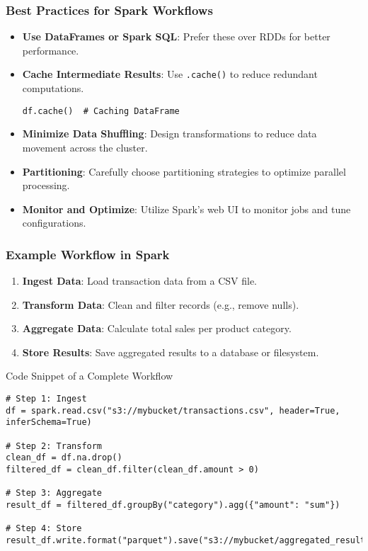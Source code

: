 \documentclass[aspectratio=169]{beamer}
\begin{document}
\begin{frame}[fragile]
    \frametitle{Best Practices for Spark Workflows}
    \begin{itemize}
        \item \textbf{Use DataFrames or Spark SQL}: Prefer these over RDDs for better performance.
        
        \item \textbf{Cache Intermediate Results}: Use \texttt{.cache()} to reduce redundant computations.
        \begin{lstlisting}
df.cache()  # Caching DataFrame
        \end{lstlisting}
        
        \item \textbf{Minimize Data Shuffling}: Design transformations to reduce data movement across the cluster.
        
        \item \textbf{Partitioning}: Carefully choose partitioning strategies to optimize parallel processing.
        
        \item \textbf{Monitor and Optimize}: Utilize Spark's web UI to monitor jobs and tune configurations.
    \end{itemize}
\end{frame}

\begin{frame}[fragile]
    \frametitle{Example Workflow in Spark}
    \begin{enumerate}
        \item \textbf{Ingest Data}: Load transaction data from a CSV file.
        \item \textbf{Transform Data}: Clean and filter records (e.g., remove nulls).
        \item \textbf{Aggregate Data}: Calculate total sales per product category.
        \item \textbf{Store Results}: Save aggregated results to a database or filesystem.
    \end{enumerate}

    \begin{block}{Code Snippet of a Complete Workflow}
    \begin{lstlisting}
# Step 1: Ingest
df = spark.read.csv("s3://mybucket/transactions.csv", header=True, inferSchema=True)

# Step 2: Transform
clean_df = df.na.drop()
filtered_df = clean_df.filter(clean_df.amount > 0)

# Step 3: Aggregate
result_df = filtered_df.groupBy("category").agg({"amount": "sum"})

# Step 4: Store
result_df.write.format("parquet").save("s3://mybucket/aggregated_results/")
    \end{lstlisting}
    \end{block}
\end{frame}
\end{document}
